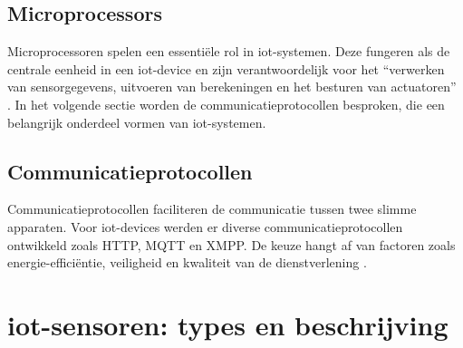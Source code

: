\subsection{Microprocessors}
Microprocessoren spelen een essentiële rol in \gls{iot}-systemen. Deze fungeren als de centrale eenheid in een \gls{iot}-device en zijn verantwoordelijk voor het “verwerken van sensorgegevens, uitvoeren van berekeningen en het besturen van actuatoren” \autocite{Abraham2023, James2021}. In het volgende sectie worden de communicatieprotocollen besproken, die een belangrijk onderdeel vormen van \gls{iot}-systemen.

\subsection{Communicatieprotocollen}
Communicatieprotocollen faciliteren de communicatie tussen twee slimme apparaten. Voor \gls{iot}-devices werden er diverse communicatieprotocollen ontwikkeld zoals HTTP, MQTT en XMPP. De keuze hangt af van factoren zoals energie-efficiëntie, veiligheid en kwaliteit van de dienstverlening \autocite{Anitha2022, Jeddou2020}. 


\section{\gls{iot}-sensoren: types en beschrijving} \autocite{Moyer2019, Sehrawat2019, Kumar2024, Balogun2017, Meenakshi2020, Tresanchez2018, Shanmugavalli2023, Gala2020, Gade2013, Chidurala2021, Karunarathne2018, Srinivasan2022}

